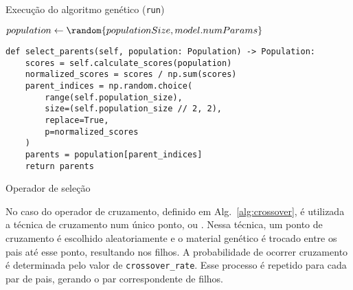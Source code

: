 \begin{algorithm}
    \caption{Execução do algoritmo genético (\texttt{run})}\label{alg:ga_run}
    $population \gets \random{populationSize, model.numParams}$\;
\end{algorithm}

\begin{listing}[!ht]
    \begin{verbatim}
def select_parents(self, population: Population) -> Population:
    scores = self.calculate_scores(population)
    normalized_scores = scores / np.sum(scores)
    parent_indices = np.random.choice(
        range(self.population_size),
        size=(self.population_size // 2, 2),
        replace=True,
        p=normalized_scores
    )
    parents = population[parent_indices]
    return parents
    \end{verbatim}
    \caption{Operador de seleção}
    \label{alg:select_parents}
\end{listing}

No caso do operador de cruzamento, definido em Alg.~\ref{alg:crossover}, é utilizada a técnica de cruzamento num único ponto, ou .
Nessa técnica, um ponto de cruzamento é escolhido aleatoriamente e o material genético é trocado entre os pais até esse ponto, resultando nos filhos.
A probabilidade de ocorrer cruzamento é determinada pelo valor de \texttt{crossover\_rate}.
Esse processo é repetido para cada par de pais, gerando o par correspondente de filhos.

